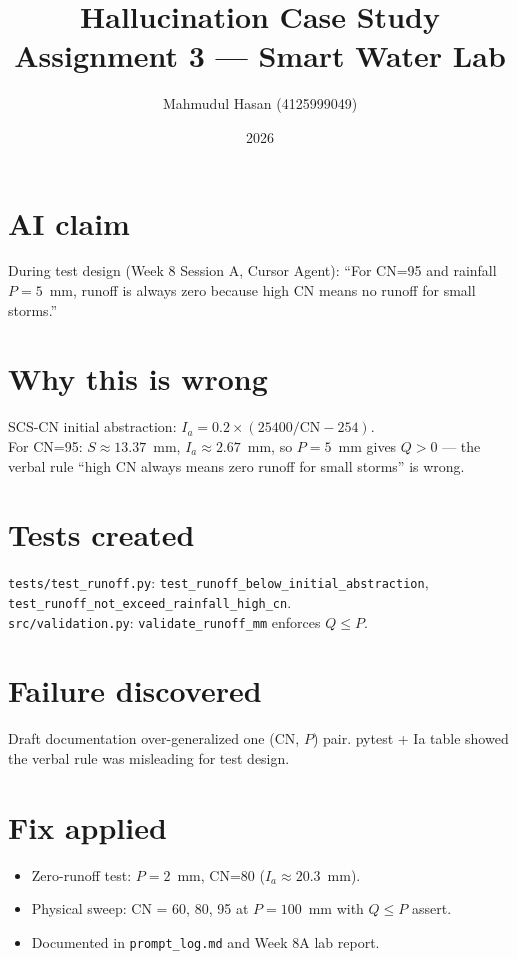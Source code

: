 \documentclass[11pt,a4paper]{article}
\title{Hallucination Case Study\\Assignment 3 --- Smart Water Lab}
\author{Mahmudul Hasan (4125999049)}
\date{2026}
\begin{document}
\maketitle

\section{AI claim}
During test design (Week 8 Session A, Cursor Agent): ``For CN=95 and rainfall $P=5$~mm, runoff is always zero because high CN means no runoff for small storms.''

\section{Why this is wrong}
SCS-CN initial abstraction: $I_a = 0.2 \times (25400/\mathrm{CN} - 254)$.\\
For CN=95: $S \approx 13.37$~mm, $I_a \approx 2.67$~mm, so $P=5$~mm gives $Q > 0$ — the verbal rule ``high CN always means zero runoff for small storms'' is wrong.

\section{Tests created}
\texttt{tests/test\_runoff.py}: \texttt{test\_runoff\_below\_initial\_abstraction}, \texttt{test\_runoff\_not\_exceed\_rainfall\_high\_cn}.\\
\texttt{src/validation.py}: \texttt{validate\_runoff\_mm} enforces $Q \le P$.

\section{Failure discovered}
Draft documentation over-generalized one (CN, $P$) pair. pytest + Ia table showed the verbal rule was misleading for test design.

\section{Fix applied}
\begin{itemize}
  \item Zero-runoff test: $P=2$~mm, CN=80 ($I_a \approx 20.3$~mm).
  \item Physical sweep: CN = 60, 80, 95 at $P=100$~mm with $Q \le P$ assert.
  \item Documented in \texttt{prompt\_log.md} and Week 8A lab report.
\end{itemize}
\end{document}
